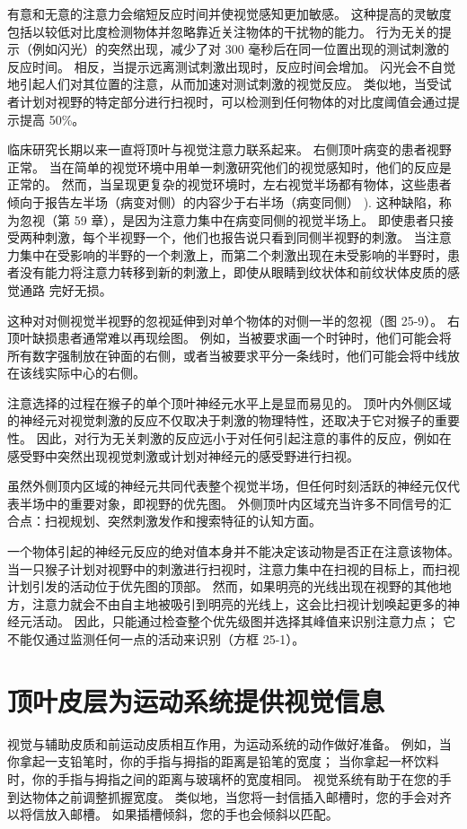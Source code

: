 有意和无意的注意力会缩短反应时间并使视觉感知更加敏感。 这种提高的灵敏度包括以较低对比度检测物体并忽略靠近关注物体的干扰物的能力。 行为无关的提示（例如闪光）的突然出现，减少了对 300 毫秒后在同一位置出现的测试刺激的反应时间。 相反，当提示远离测试刺激出现时，反应时间会增加。 闪光会不自觉地引起人们对其位置的注意，从而加速对测试刺激的视觉反应。 类似地，当受试者计划对视野的特定部分进行扫视时，可以检测到任何物体的对比度阈值会通过提示提高 50\%。

临床研究长期以来一直将顶叶与视觉注意力联系起来。 右侧顶叶病变的患者视野正常。 当在简单的视觉环境中用单一刺激研究他们的视觉感知时，他们的反应是正常的。 然而，当呈现更复杂的视觉环境时，左右视觉半场都有物体，这些患者倾向于报告左半场（病变对侧）的内容少于右半场（病变同侧） ). 这种缺陷，称为忽视（第 59 章），是因为注意力集中在病变同侧的视觉半场上。 即使患者只接受两种刺激，每个半视野一个，他们也报告说只看到同侧半视野的刺激。 当注意力集中在受影响的半野的一个刺激上，而第二个刺激出现在未受影响的半野时，患者没有能力将注意力转移到新的刺激上，即使从眼睛到纹状体和前纹状体皮质的感觉通路 完好无损。

这种对对侧视觉半视野的忽视延伸到对单个物体的对侧一半的忽视（图 25-9）。 右顶叶缺损患者通常难以再现绘图。 例如，当被要求画一个时钟时，他们可能会将所有数字强制放在钟面的右侧，或者当被要求平分一条线时，他们可能会将中线放在该线实际中心的右侧。

注意选择的过程在猴子的单个顶叶神经元水平上是显而易见的。 顶叶内外侧区域的神经元对视觉刺激的反应不仅取决于刺激的物理特性，还取决于它对猴子的重要性。 因此，对行为无关刺激的反应远小于对任何引起注意的事件的反应，例如在感受野中突然出现视觉刺激或计划对神经元的感受野进行扫视。

虽然外侧顶内区域的神经元共同代表整个视觉半场，但任何时刻活跃的神经元仅代表半场中的重要对象，即视野的优先图。 外侧顶叶内区域充当许多不同信号的汇合点：扫视规划、突然刺激发作和搜索特征的认知方面。

一个物体引起的神经元反应的绝对值本身并不能决定该动物是否正在注意该物体。 当一只猴子计划对视野中的刺激进行扫视时，注意力集中在扫视的目标上，而扫视计划引发的活动位于优先图的顶部。 然而，如果明亮的光线出现在视野的其他地方，注意力就会不由自主地被吸引到明亮的光线上，这会比扫视计划唤起更多的神经元活动。 因此，只能通过检查整个优先级图并选择其峰值来识别注意力点； 它不能仅通过监测任何一点的活动来识别（方框 25-1）。


\section{顶叶皮层为运动系统提供视觉信息}
视觉与辅助皮质和前运动皮质相互作用，为运动系统的动作做好准备。 例如，当你拿起一支铅笔时，你的手指与拇指的距离是铅笔的宽度； 当你拿起一杯饮料时，你的手指与拇指之间的距离与玻璃杯的宽度相同。 视觉系统有助于在您的手到达物体之前调整抓握宽度。 类似地，当您将一封信插入邮槽时，您的手会对齐以将信放入邮槽。 如果插槽倾斜，您的手也会倾斜以匹配。

